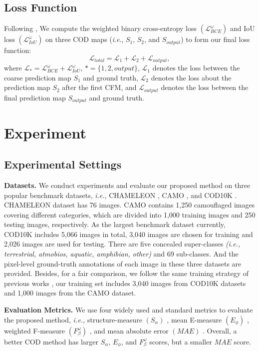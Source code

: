 \documentclass[sigconf,screen]{acmart}
\newcommand{\ie}{\textit{i}.\textit{e}.}
\begin{document}
\subsection {Loss Function}
Following \cite{r51}, We compute the weighted binary cross-entropy loss \((\mathcal{L}_{BCE}^\omega)\) and IoU loss \((\mathcal{L}_{IoU}^\omega)\) on three COD maps (\ie, $S_1$, $S_2$, and $S_{output}$) to form our final loss function:
\begin{equation}
    \mathcal{L}_{total} = \mathcal{L}_1 + \mathcal{L}_2 + \mathcal{L}_{output},
\end{equation}
where $\mathcal{L}_* = \mathcal{L}_{BCE}^\omega +\mathcal{L}_{IoU}^\omega$, $*=\{1, 2, output\}$, \(\mathcal{L}_1\) denotes the loss between the coarse prediction map $S_1$ and ground truth, \(\mathcal{L}_2\) denotes the loss about the prediction map $S_2$ after the first CFM, and \(\mathcal{L}_{output}\) denotes the loss between the final prediction map $S_{output}$ and ground truth. 


\section{Experiment}



\subsection {Experimental Settings}
\textbf{Datasets. }
We conduct experiments and evaluate our proposed method on three popular benchmark datasets, \textit{i.e.}, CHAMELEON \cite{r42}, CAMO \cite{r41}, and COD10K \cite{r7}. 
CHAMELEON \cite{r42} dataset has 76 images. CAMO \cite{r41} contains 1,250 camouflaged images covering different categories, which are divided into 1,000 training images and 250 testing images, respectively. As the largest benchmark dataset currently, COD10K \cite{r7} includes 5,066 images in total, 3,040 images are chosen for training and 2,026 images are used for testing. There are five concealed super-classes \textit{(\ie, terrestrial, atmobios, aquatic, amphibian, other)} and 69 sub-classes. And the pixel-level ground-truth annotations of each image in these three datasets are provided. Besides, for a fair comparison, we follow the same training strategy of previous works \cite{r39}, our training set includes 3,040 images from COD10K datasets and 1,000 images from the CAMO dataset. 

\noindent \textbf{Evaluation Metrics. }
We use four widely used and standard metrics to evaluate the proposed method, \textit{\ie,} structure-measure \((S_\alpha)\) \cite{r43}, mean E-measure \((E_\phi)\) \cite{r45}, weighted F-measure \((F_\beta ^\omega)\) \cite{r44}, and mean absolute error \((MAE)\) \cite{crm/eccv20/RGBDSOD,crm/nips20/CoADNet,crm/tcyb21/ASIFNet}. Overall, a better COD method has larger \(S_\alpha\), \(E_\phi\), and \(F_\beta ^\omega\) scores, but a smaller \(MAE\) score.
\end{document}
